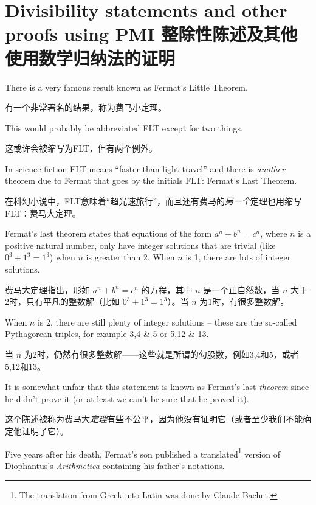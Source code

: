 \newpage
  


 
\newpage

\section[Other proofs using PMI]{Divisibility statements and other proofs using PMI 整除性陈述及其他使用数学归纳法的证明}
\label{sec:other_pmi}

There is a very famous result known as 
Fermat's Little Theorem.

有一个非常著名的结果，称为费马小定理。

This would probably be abbreviated FLT except for two things.

这或许会被缩写为FLT，但有两个例外。

In science fiction FLT means ``faster than light travel'' and 
there is \emph{another} theorem due to Fermat that goes by
the initials FLT: Fermat's Last Theorem.

在科幻小说中，FLT意味着“超光速旅行”，而且还有费马的\emph{另一个}定理也用缩写FLT：费马大定理。

Fermat's last theorem states that equations of the form $a^n+b^n=c^n$,
where $n$ is a positive natural number, 
only have integer solutions that are trivial (like $0^3+1^3=1^3$) when $n$
is greater than 2.  When $n$ is 1, there are lots of integer solutions.

费马大定理指出，形如 $a^n+b^n=c^n$ 的方程，其中 $n$ 是一个正自然数，当 $n$ 大于2时，只有平凡的整数解（比如 $0^3+1^3=1^3$）。当 $n$ 为1时，有很多整数解。

When $n$ is 2, there are still plenty of integer solutions -- these are the
so-called Pythagorean triples, for example 3,4 \& 5 or 5,12 \& 13.  

当 $n$ 为2时，仍然有很多整数解——这些就是所谓的勾股数，例如3,4和5，或者5,12和13。

It is somewhat unfair that this statement is known as Fermat's last \emph{theorem} since he didn't prove it (or at least we can't be sure that he proved it).

这个陈述被称为费马大\emph{定理}有些不公平，因为他没有证明它（或者至少我们不能确定他证明了它）。

Five years after his death, Fermat's son published a translated\footnote{The
translation from Greek into Latin was done by Claude Bachet.} version of
Diophantus's \emph{Arithmetica} containing his father's notations.

